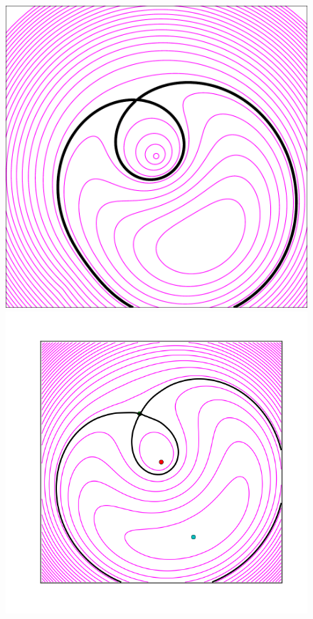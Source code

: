 \begin{figure}
  \includegraphics[width=\myplotswidth]{fig/ASW0000vqg_006937_arriv}
  \includegraphics[width=\myplotswidth]{fig/006937_spaghetti} \\

\end{figure}
